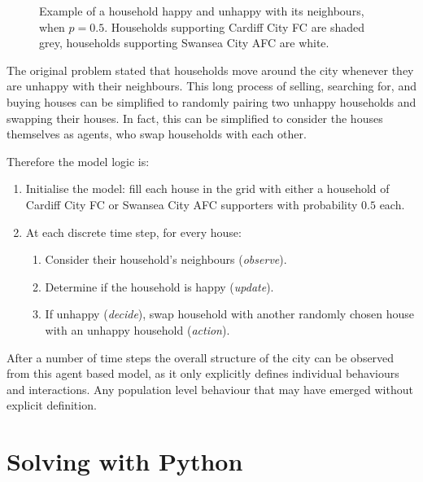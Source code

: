 \begin{figure}
    \begin{center}
        \subfigure[A happy household, with 6 similar neighbours (\(\frac{6}{8} > p = 0.5\))]{}
        \subfigure[An unhappy household, with 2 similar neighbours (\(\frac{2}{8} < p = 0.5\))]{}
    \end{center}
    \caption{Example of a household happy and unhappy with its neighbours, when
    \(p=0.5\). Households supporting Cardiff City FC are shaded grey, households
    supporting Swansea City AFC are white.}
    \label{fig:schelling_happyunhappy}
\end{figure}

The original problem stated that households move around the city
whenever they are unhappy with their neighbours.
This long process of selling, searching for, and buying houses can be simplified
to randomly pairing two unhappy households and swapping their houses.
In fact, this can be simplified to consider the houses themselves as agents,
who swap households with each other.

Therefore the model logic is:

\begin{enumerate}
  \item Initialise the model: fill each house in the grid with either a
  household of Cardiff City FC or Swansea City AFC supporters with
  probability \(0.5\) each.
  \item At each discrete time step, for every house:
  \begin{enumerate}
    \item Consider their household's neighbours (\textit{observe}).
    \item Determine if the household is happy (\textit{update}).
    \item If unhappy (\textit{decide}), swap household with another randomly
    chosen house with an unhappy household (\textit{action}).
  \end{enumerate}
\end{enumerate}

After a number of time steps the overall structure of the city can be observed
from this agent based model, as it only explicitly defines individual behaviours
and interactions.  Any population level behaviour that may have emerged without
explicit definition.

\section{Solving with Python}\label{sec:solving-with-python}

